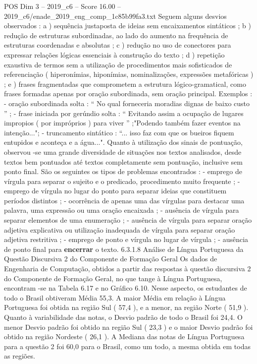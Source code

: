 \begin{textsample}{POS Dim 3 – 2019\_c6 – Score 16.00 – 2019\_c6/enade\_2019\_eng\_comp\_1c85b99fa3.txt}
Seguem alguns desvios observados : a ) sequência justaposta de ideias sem encaixamentos sintáticos ; b ) redução de estruturas subordinadas, ao lado do aumento na frequência de estruturas coordenadas e absolutas ; c ) redução no uso de conectores para expressar relações lógicas essenciais à construção do texto ; d ) repetição exaustiva de termos sem a utilização de procedimentos mais sofisticados de referenciação ( hiperonímias, hiponímias, nominalizações, expressões metafóricas ) ; e ) frases fragmentadas que comprometem a estrutura lógico-gramatical, como frases formadas apenas por oração subordinada, sem oração principal.
Exemplos : - oração subordinada solta : “ No qual forneceria moradias dignas de baixo custo ” ; - frase iniciada por gerúndio solta : “ Evitando assim a ocupação de lugares impropios ( por impróprios ) para viver ” ;"Podendo também fazer eventos na intenção..."; - truncamento sintático : “... isso faz com que os bueiros fiquem entupidos e aconteça e a água...".
Quanto à utilização dos sinais de pontuação, observou -se uma grande diversidade de situações nos textos analisados, desde textos bem pontuados até textos completamente sem pontuação, inclusive sem ponto final.
São os seguintes os tipos de problemas encontrados : - emprego de vírgula para separar o sujeito e o predicado, procedimento muito frequente ; - emprego de vírgula no lugar do ponto para separar ideias que constituem períodos distintos ; - ocorrência de apenas uma das vírgulas para destacar uma palavra, uma expressão ou uma oração encaixada ; - ausência de vírgula para separar elementos de uma enumeração ; - ausência de vírgula para separar oração adjetiva explicativa ou utilização inadequada de vírgula para separar oração adjetiva restritiva ; - emprego de ponto e vírgula no lugar de vírgula ; - ausência de ponto final para \textbf{encerrar} o texto. 6.3.1.8 Análise de Língua Portuguesa da Questão Discursiva 2 do Componente de Formação Geral Os dados de Engenharia de Computação, obtidos a partir das respostas à questão discursiva 2 do Componente de Formação Geral, no que tange à Língua Portuguesa, encontram -se na Tabela 6.17 e no Gráfico 6.10.
Nesse aspecto, os estudantes de todo o Brasil obtiveram Média 55,3.
A maior Média em relação à Língua Portuguesa foi obtida na região Sul ( 57,4 ), e a menor, na região Norte ( 51,9 ).
Quanto à variabilidade das notas, o Desvio padrão de todo o Brasil foi 24,4.
O menor Desvio padrão foi obtido na região Sul ( 23,3 ) e o maior Desvio padrão foi obtido na região Nordeste ( 26,1 ).
A Mediana das notas de Língua Portuguesa para a questão 2 foi 60,0 para o Brasil, como um todo, a mesma obtida em todas as regiões.

\end{textsample}
